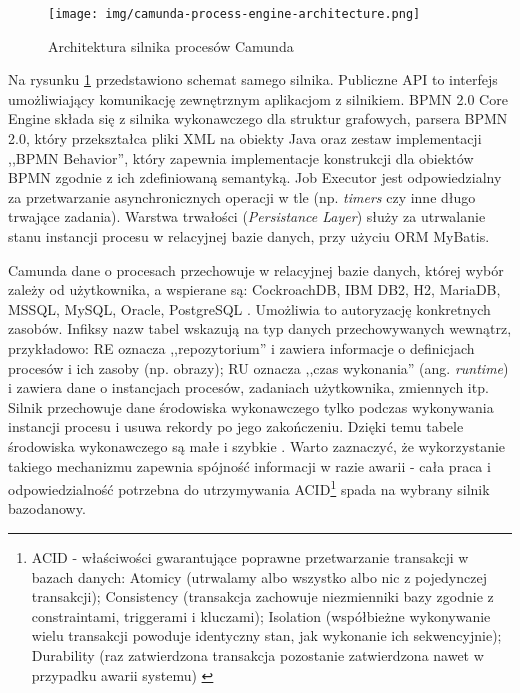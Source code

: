 \documentclass[declaration,shortabstract,mgr]{iithesis}
\begin{document}
\begin{figure}
    \texttt{[image: img/camunda-process-engine-architecture.png]}
    \caption{Architektura silnika procesów Camunda \cite{camunda-process-engine-architecture}}
    \label{fig:camunda-process-engine-architecture}
\end{figure}

Na rysunku \ref{fig:camunda-process-engine-architecture} przedstawiono schemat samego silnika. Publiczne API to interfejs umożliwiający komunikację zewnętrznym aplikacjom z silnikiem. BPMN 2.0 Core Engine składa się z silnika wykonawczego dla struktur grafowych, parsera BPMN 2.0, który przekształca pliki XML na obiekty Java oraz zestaw implementacji ,,BPMN Behavior'', który zapewnia implementacje konstrukcji dla obiektów BPMN zgodnie z ich zdefiniowaną semantyką. Job Executor jest odpowiedzialny za przetwarzanie asynchronicznych operacji w tle (np. \textit{timers} czy inne długo trwające zadania). Warstwa trwałości (\emph{Persistance Layer}) służy za utrwalanie stanu instancji procesu w relacyjnej bazie danych, przy użyciu ORM MyBatis.

Camunda dane o procesach przechowuje w relacyjnej bazie danych, której wybór zależy od użytkownika, a wspierane są: CockroachDB, IBM DB2, H2, MariaDB, MSSQL, MySQL, Oracle, PostgreSQL \cite{camunda-docs-supported-db}. Umożliwia to autoryzację konkretnych zasobów. Infiksy nazw tabel wskazują na typ danych przechowywanych wewnątrz, przykładowo: RE oznacza ,,repozytorium'' i zawiera informacje o definicjach procesów i ich zasoby (np. obrazy); RU oznacza ,,czas wykonania'' (ang. \textit{runtime}) i zawiera dane o instancjach procesów, zadaniach użytkownika, zmiennych itp. Silnik przechowuje dane środowiska wykonawczego tylko podczas wykonywania instancji procesu i usuwa rekordy po jego zakończeniu. Dzięki temu tabele środowiska wykonawczego są małe i szybkie \cite{camunda-docs-db}. Warto zaznaczyć, że wykorzystanie takiego mechanizmu zapewnia spójność informacji w razie awarii - cała praca i odpowiedzialność potrzebna do utrzymywania ACID\footnote{ACID - właściwości gwarantujące poprawne przetwarzanie transakcji w bazach danych: Atomicy (utrwalamy albo wszystko albo nic z pojedynczej transakcji); Consistency (transakcja zachowuje niezmienniki bazy zgodnie z constraintami, triggerami i kluczami); Isolation (współbieżne wykonywanie wielu transakcji powoduje identyczny stan, jak wykonanie ich sekwencyjnie); Durability (raz zatwierdzona transakcja pozostanie zatwierdzona nawet w przypadku awarii systemu) \cite{wiki-acid}} spada na wybrany silnik bazodanowy.
\end{document}
